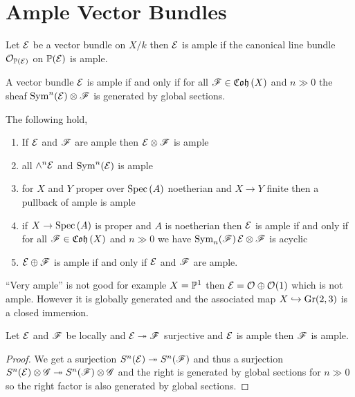 \documentclass[12pt]{article}
\begin{document}
\section{Ample Vector Bundles}

\begin{defn}
Let $\E$ be a vector bundle on $X / k$ then $\E$ is ample if the canonical line bundle $\struct{\P(\E)}$ on $\P(\E)$ is ample. 
\end{defn}

\begin{prop}
A vector bundle $\E$ is ample if and only if for all $\F \in \Coh{X}$ and $n \gg 0$ the sheaf $\nSym{n}{\E} \ot \F$ is generated by global sections.
\end{prop}

\begin{prop}
The following hold,
\begin{enumerate}
\item If $\E$ and $\F$ are ample then $\E \ot \F$ is ample
\item all $\wedge^n \E$ and $\nSym{n}{\E}$ is ample
\item for $X$ and $Y$ proper over $\Spec{A}$ noetherian and $X \to Y$ finite then a pullback of ample is ample
\item if $X \to \Spec{A}$ is proper and $A$ is noetherian then $\E$ is ample if and only if for all $\F \in \Coh{X}$ and $n \gg 0$ we have $\Sym{n}{\F}{\E} \ot \F$ is acyclic
\item $\E \oplus \F$ is ample if and only if $\E$ and $\F$ are ample.
\end{enumerate}
\end{prop}

\begin{rmk}
``Very ample'' is not good for example $X = \P^1$ then $\E = \struct{} \oplus \struct{}(1)$ which is not ample. However it is globally generated and the associated map $X \embed \mathrm{Gr}(2,3)$ is a closed immersion.
\end{rmk}

\begin{prop}
Let $\E$ and $\F$ be locally and $\E \onto \F$ surjective and $\E$ is ample then $\F$ is ample.
\end{prop}

\begin{proof}
We get a surjection $S^n(\E) \onto S^n(\F)$ and thus a surjection $S^n(\E) \ot \G \onto S^n(\F) \ot \G$ and the right is generated by global sections for $n \gg 0$ so the right factor is also generated by global sections.
\end{proof}
\end{document}
